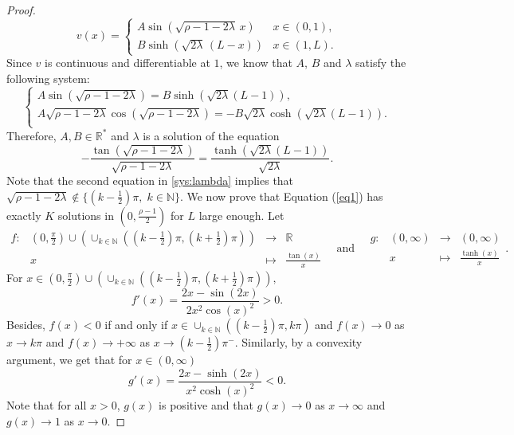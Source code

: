 \documentclass[11pt]{article}
\theoremstyle{plain}
\begin{document}
\begin{proof}
\begin{equation*}
    v(x)=\begin{cases}
         A\sin\left(\sqrt{\rho-1-2\lambda}\,x\right) &  x\in (0,1), \\
         B\sinh\left(\sqrt{2\lambda}\,(L-x)\right) &x\in(1,L).
    \end{cases}
    \label{ev}
\end{equation*}
Since $v$ is continuous and differentiable at $1$,  we know that $A$, $B$ and $\lambda$ satisfy the following system:
\begin{equation}\label{sys:lambda}
    \begin{cases}
    A\sin(\sqrt{\rho-1-2\lambda})=B\sinh(\sqrt{2\lambda}(L-1)),\\
    A\sqrt{\rho-1-2\lambda}\cos(\sqrt{\rho-1-2\lambda})=-B\sqrt{2\lambda}\cosh(\sqrt{2\lambda}(L-1)).\\ 
    \end{cases}
\end{equation} 
Therefore, $A,B\in\mathbb{R}^*$ and $\lambda$ is a solution of the equation 
\begin{equation}
    -\frac{\tan(\sqrt{\rho-1-2\lambda})}{\sqrt{\rho-1-2\lambda}}=\frac{\tanh(\sqrt{2\lambda}(L-1))}{\sqrt{2\lambda}}.
    \label{eq1}
\end{equation}
Note that the second equation in \eqref{sys:lambda} implies that $\sqrt {\rho-1-2\lambda}\notin\{\left(k-\frac{1}{2}\right)\pi, \; k\in\mathbb{N}\}$. We now prove that Equation (\ref{eq1}) has exactly $K$ solutions in $\left(0,\frac{\rho-1}{2}\right)$ for $L$ large enough. Let 
\begin{equation*}\label{deffg}
\begin{array}{l|rcl}
f : & (0,\frac{\pi}{2})\cup\left(\cup_{k\in\mathbb{N}}\left(\left(k-\frac{1}{2}\right)\pi,\left(k+\frac{1}{2}\right)\pi\right)\right) & \rightarrow & \mathbb{R}\\
    & x & \mapsto & \frac{\tan(x)}{x}\end{array}
 \quad \text{and}  \quad \begin{array}{l|rcl}g: & (0,\infty) & \rightarrow & (0,\infty) \\
    & x & \mapsto & \frac{\tanh(x)}{x}\end{array}.
\end{equation*}
For $x\in(0,\frac{\pi}{2})\cup\left(\cup_{k\in\mathbb{N}}\left(\left(k-\frac{1}{2}\right)\pi,\left(k+\frac{1}{2}\right)\pi\right)\right),$ $$f'(x)=\frac{2x-\sin(2x)}{2x^2\cos(x)^2}>0.$$ Besides, $f(x)<0$ if and only if $x\in\cup_{k\in\mathbb{N}}\left(\left(k-\frac{1}{2}\right)\pi,k\pi\right)$ and $f(x)\rightarrow 0$ as $x\rightarrow k\pi$ and $f(x)\rightarrow +\infty$ as $x\rightarrow \left(k-\frac{1}{2}\right)\pi^-$. Similarly, by a convexity argument, we get that for $x\in(0,\infty)$ $$g'(x)=\frac{2x-\sinh(2x)}{x^2\cosh(x)^2}<0.$$ Note that for all $x>0$, $g(x)$ is positive and that  $g(x)\to 0$ as $x\to\infty$ and $g(x)\to1$ as $x\to 0$.

\end{proof}
\end{document}
